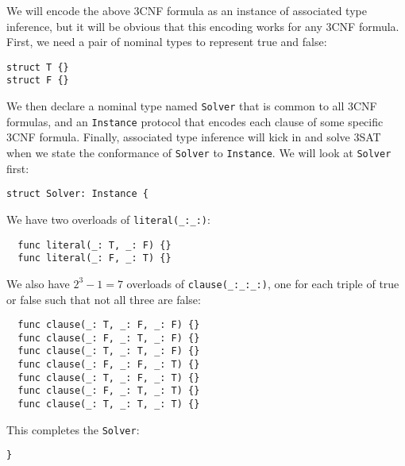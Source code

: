 \documentclass[../generics]{subfiles}
\begin{document}
We will encode the above 3CNF formula as an instance of associated type inference, but it will be obvious that this encoding works for any 3CNF formula. First, we need a pair of nominal types to represent true and false:
\begin{Verbatim}
struct T {}
struct F {}
\end{Verbatim}
We then declare a nominal type named \texttt{Solver} that is common to all 3CNF formulas, and an \texttt{Instance} protocol that encodes each clause of some specific 3CNF formula. Finally, associated type inference will kick in and solve 3SAT when we state the conformance of \texttt{Solver} to \texttt{Instance}. We will look at \texttt{Solver} first:
\begin{Verbatim}
struct Solver: Instance {
\end{Verbatim}
We have two overloads of \verb|literal(_:_:)|:
\begin{Verbatim}
  func literal(_: T, _: F) {}
  func literal(_: F, _: T) {}
\end{Verbatim}
We also have $2^3-1=7$ overloads of \verb|clause(_:_:_:)|, one for each triple of true or false such that not all three are false:
\begin{Verbatim}
  func clause(_: T, _: F, _: F) {}
  func clause(_: F, _: T, _: F) {}
  func clause(_: T, _: T, _: F) {}
  func clause(_: F, _: F, _: T) {}
  func clause(_: T, _: F, _: T) {}
  func clause(_: F, _: T, _: T) {}
  func clause(_: T, _: T, _: T) {}
\end{Verbatim}
This completes the \texttt{Solver}:
\begin{Verbatim}
}
\end{Verbatim}
\pagebreak
\end{document}
